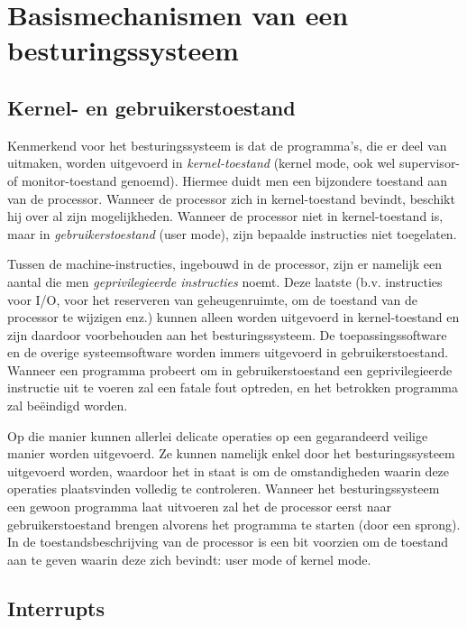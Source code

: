 \chapter{Basismechanismen van een besturingssysteem}\label{chap:basis}

\section{Kernel- en gebruikerstoestand}

Kenmerkend voor het besturingssysteem is dat de programma's, die
er deel van uitmaken, worden uitgevoerd in
\emph{kernel-toestand} (kernel mode, ook wel supervisor-
of monitor-toestand genoemd). Hiermee duidt men een bijzondere toestand
aan van de processor. Wanneer de processor zich in kernel-toestand
bevindt, beschikt hij over al zijn mogelijkheden. Wanneer de processor
niet in kernel-toestand is, maar in
\emph{gebruikerstoestand} (user mode), zijn bepaalde
instructies niet toegelaten.

Tussen de machine-instructies, ingebouwd in de processor, zijn er
namelijk een aantal die men \emph{geprivilegieerde instructies}
noemt. Deze laatste (b.v. instructies voor I/O, voor het
reserveren van geheugenruimte, om de toestand van de processor te
wijzigen enz.) kunnen alleen worden uitgevoerd in kernel-toestand en
zijn daardoor voorbehouden aan het besturingssysteem. De
toepassingssoftware en de overige systeemsoftware worden immers
uitgevoerd in gebruikerstoestand. Wanneer een programma probeert om in
gebruikerstoestand een geprivilegieerde instructie uit te voeren zal een
fatale fout optreden, en het betrokken programma zal be\"eindigd
worden.

Op die manier kunnen allerlei delicate operaties op een
gegarandeerd veilige manier worden uitgevoerd. Ze kunnen namelijk enkel
door het besturingssysteem uitgevoerd worden, waardoor het in staat is
om de omstandigheden waarin deze operaties plaatsvinden volledig te
controleren. Wanneer het besturingssysteem een gewoon programma laat
uitvoeren zal het de processor eerst naar gebruikerstoestand brengen
alvorens het programma te starten (door een sprong). In de
toestandsbeschrijving van de processor is een bit voorzien om de
toestand aan te geven waarin deze zich bevindt: user mode of kernel
mode.

\section{Interrupts}

